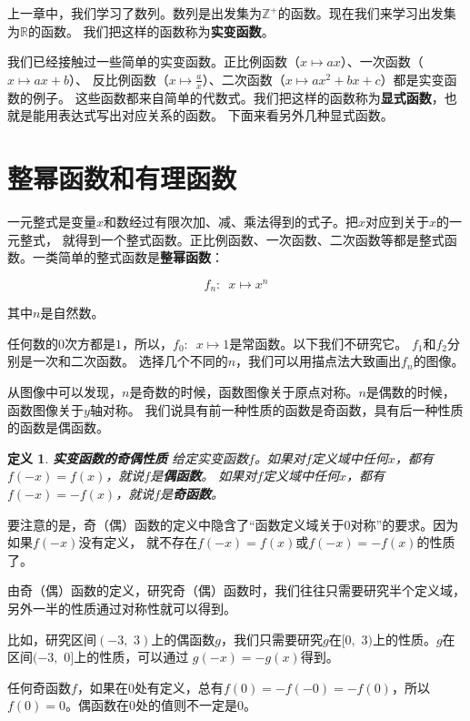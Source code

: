 \documentclass[12pt,UTF8]{ctexbook}
\newtheorem{df}{定义}[section]
\begin{document}
上一章中，我们学习了数列。数列是出发集为$\mathbb{Z}^+$的函数。现在我们来学习出发集为$\mathbb{R}$的函数。
我们把这样的函数称为\textbf{实变函数}。

我们已经接触过一些简单的实变函数。正比例函数（$x\mapsto ax$）、一次函数（$x\mapsto ax + b$）、
反比例函数（$x\mapsto \frac{a}{x}$）、二次函数（$x\mapsto ax^2 + bx + c$）都是实变函数的例子。
这些函数都来自简单的代数式。我们把这样的函数称为\textbf{显式函数}，也就是能用表达式写出对应关系的函数。
下面来看另外几种显式函数。

\section{整幂函数和有理函数}

一元整式是变量$x$和数经过有限次加、减、乘法得到的式子。把$x$对应到关于$x$的一元整式，
就得到一个整式函数。正比例函数、一次函数、二次函数等都是整式函数。一类简单的整式函数是\textbf{整幂函数}：

$$f_n: \,\,\, x \mapsto x^n$$

其中$n$是自然数。

任何数的$0$次方都是$1$，所以，$f_0:\,\,\, x\mapsto 1$是常函数。以下我们不研究它。
$f_1$和$f_2$分别是一次和二次函数。
选择几个不同的$n$，我们可以用描点法大致画出$f_n$的图像。


从图像中可以发现，$n$是奇数的时候，函数图像关于原点对称。$n$是偶数的时候，函数图像关于$y$轴对称。
我们说具有前一种性质的函数是奇函数，具有后一种性质的函数是偶函数。
\begin{df}\textbf{实变函数的奇偶性质}
    给定实变函数$f$。如果对$f$定义域中任何$x$，都有$f(-x) = f(x)$，就说$f$是\textbf{偶函数}。
如果对$f$定义域中任何$x$，都有$f(-x) = -f(x)$，就说$f$是\textbf{奇函数}。
\end{df}

要注意的是，奇（偶）函数的定义中隐含了“函数定义域关于$0$对称”的要求。因为如果$f(-x)$没有定义，
就不存在$f(-x) = f(x)$或$f(-x) = -f(x)$的性质了。

由奇（偶）函数的定义，研究奇（偶）函数时，我们往往只需要研究半个定义域，另外一半的性质通过对称性就可以得到。

比如，研究区间$(-3, \,\,3)$上的偶函数$g$，我们只需要研究$g$在$[0, \,\,3)$上的性质。$g$在区间$(-3,\,\,0]$上的性质，可以通过
$g(-x) = -g(x)$得到。

任何奇函数$f$，如果在$0$处有定义，总有$f(0) = - f(-0) = - f(0)$，所以$f(0) = 0$。偶函数在$0$处的值则不一定是$0$。
\end{document}
